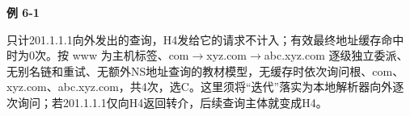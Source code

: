 {\color{ink}\bfseries 例 6-1}\par\vspace{1bp}只计201.1.1.1向外发出的查询，H4发给它的请求不计入；有效最终地址缓存命中时为0次。按 www 为主机标签、com\(\to \)xyz.com\(\to \)abc.xyz.com 逐级独立委派、无别名链和重试、无额外NS地址查询的教材模型，无缓存时依次询问根、com、xyz.com、abc.xyz.com，共4次，选C。这里须将“迭代”落实为本地解析器向外逐次询问；若201.1.1.1仅向H4返回转介，后续查询主体就变成H4。

